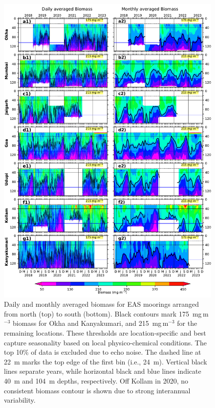 \documentclass[authoryear,review,11pt]{elsarticle}
\begin{document}
\begin{figure}[htbp]
	\centering
	\includegraphics[width=\textwidth]{./figures/biomass_daily_monthly.pdf} 
	\captionsetup{justification=justified,font=footnotesize,skip=0.05\baselineskip,width=\textwidth}
	\caption{Daily and monthly averaged biomass for EAS moorings arranged from north (top) to south (bottom). Black contours mark 175~mg\,m$^{-3}$ biomass for Okha and Kanyakumari, and 215~mg\,m$^{-3}$ for the remaining locations. These thresholds are location-specific and best capture seasonality based on local physico-chemical conditions. The top 10\% of data is excluded due to echo noise. The dashed line at 22~m marks the top edge of the first bin (i.e., 24~m). Vertical black lines separate years, while horizontal black and blue lines indicate 40~m and 104~m depths, respectively. Off Kollam in 2020, no consistent biomass contour is shown due to strong interannual variability.}
	\label{fig:biomass_daily_monthly}
\end{figure}
\end{document}
